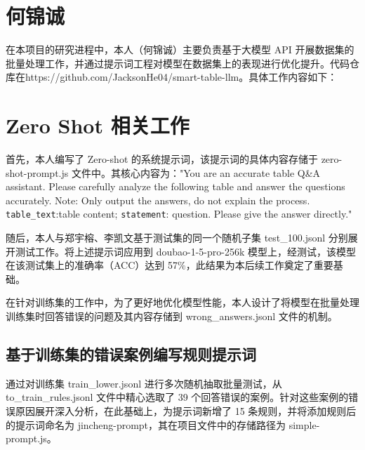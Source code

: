 \section{何锦诚}
在本项目的研究进程中，本人（何锦诚）主要负责基于大模型 API 开展数据集的批量处理工作，并通过提示词工程对模型在数据集上的表现进行优化提升。代码仓库在https://github.com/JacksonHe04/smart-table-llm。具体工作内容如下：

\section{Zero Shot 相关工作}
首先，本人编写了 Zero-shot 的系统提示词，该提示词的具体内容存储于 zero-shot-prompt.js 文件中。其核心内容为："You are an accurate table Q\&A assistant. Please carefully analyze the following table and answer the questions accurately. Note: Only output the answers, do not explain the process. \texttt{table\_text}:table content; \texttt{statement}: question. Please give the answer directly." 



随后，本人与郑宇榕、李凯文基于测试集的同一个随机子集 test\_100.jsonl 分别展开测试工作。将上述提示词应用到 doubao-1-5-pro-256k 模型上，经测试，该模型在该测试集上的准确率（ACC）达到 57\%，此结果为本后续工作奠定了重要基础。

在针对训练集的工作中，为了更好地优化模型性能，本人设计了将模型在批量处理训练集时回答错误的问题及其内容存储到 wrong\_answers.jsonl 文件的机制。

\subsection{基于训练集的错误案例编写规则提示词}
通过对训练集 train\_lower.jsonl 进行多次随机抽取批量测试，从 to\_train\_rules.jsonl 文件中精心选取了 39 个回答错误的案例。针对这些案例的错误原因展开深入分析，在此基础上，为提示词新增了 15 条规则，并将添加规则后的提示词命名为 jincheng-prompt，其在项目文件中的存储路径为 simple-prompt.js。

